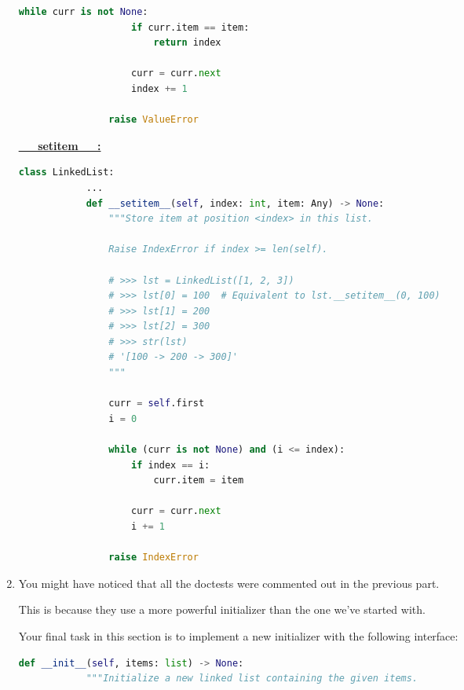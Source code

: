 \documentclass[12pt]{article}
\begin{document}
\begin{enumerate}[1.]
\begin{mdframed}
\begin{lstlisting}[language=python,caption={task\_1\_step\_2\_solution.py}]
                while curr is not None:
                    if curr.item == item:
                        return index

                    curr = curr.next
                    index += 1

                raise ValueError
        \end{lstlisting}

        \bigskip

        \underline{\textbf{\_\_setitem\_\_:}}

        \bigskip

        \begin{lstlisting}[language=python,caption={task\_1\_step\_2\_solution.py}]
        class LinkedList:
            ...
            def __setitem__(self, index: int, item: Any) -> None:
                """Store item at position <index> in this list.

                Raise IndexError if index >= len(self).

                # >>> lst = LinkedList([1, 2, 3])
                # >>> lst[0] = 100  # Equivalent to lst.__setitem__(0, 100)
                # >>> lst[1] = 200
                # >>> lst[2] = 300
                # >>> str(lst)
                # '[100 -> 200 -> 300]'
                """

                curr = self.first
                i = 0

                while (curr is not None) and (i <= index):
                    if index == i:
                        curr.item = item

                    curr = curr.next
                    i += 1

                raise IndexError
        \end{lstlisting}
    \end{mdframed}

    \item You might have noticed that all the doctests were commented out in the previous part.

    This is because they use a more powerful initializer than the one we’ve started with.

    \bigskip

    Your final task in this section is to implement a new initializer with the following interface:

    \bigskip

    \begin{lstlisting}[language=python]
        def __init__(self, items: list) -> None:
            """Initialize a new linked list containing the given items.


\end{lstlisting}
\end{enumerate}
\end{document}
